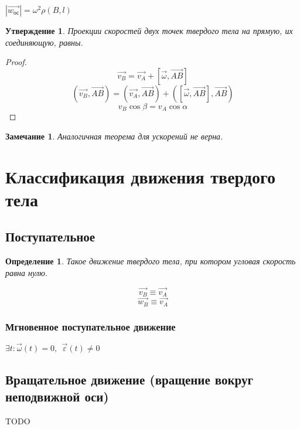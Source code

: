 \documentclass{article}
\newtheorem*{df}{Определение}
\newtheorem{ass}{Утверждение}
\newtheorem*{ntc}{Замечание}
\begin{document}
  $ | \vec{w_{\textbf{ос}}} |= \omega^2 \rho(B, l) $
  
  \begin{ass}
  Проекции скоростей двух точек твердого тела на прямую, их соединяющую, равны.
  \end{ass}
  \begin{proof}
  $$ \vec{v_B} = \vec{v_A} + [\vec{\omega}, \vec{AB}] $$
  $$ (\vec{v_B}, \vec{AB}) = (\vec{v_A}, \vec{AB}) + ([\vec{\omega}, \vec{AB}], \vec{AB}) $$
  $$ v_B \cos \beta = v_A \cos \alpha $$
  \end{proof}
  \begin{ntc}
  Аналогичная теорема для ускорений не верна.
  \end{ntc}
  
  \section{Классификация движения твердого тела}
  
  \subsection{Поступательное}
  \begin{df}
  Такое движение твердого тела, при котором угловая скорость равна нулю.
  \end{df}
  $$ \vec{v_B} \equiv \vec{v_A} $$
  $$ \vec{w_B} \equiv \vec{v_A} $$
  \subsubsection{Мгновенное поступательное движение}
  $ \exists t : \vec{\omega}(t) = 0,~~ \vec{\varepsilon}(t) \neq 0 $
  
  \subsection{Вращательное движение (вращение вокруг неподвижной оси)}
  
  TODO
\end{document}
